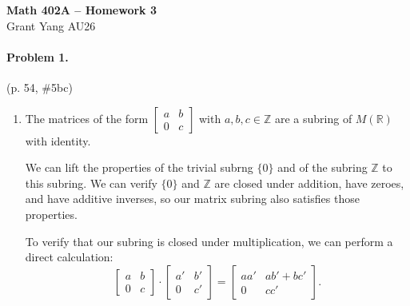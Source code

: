 \documentclass[12pt]{article}
\begin{document}
\begin{center} 
    {\large \textbf{Math 402A -- Homework 3}}
    \smallskip \\ 
    Grant Yang \hspace{1em} AU26
\end{center}

\paragraph{Problem 1.} (p. 54, \#5bc)
\begin{enumerate}
    \item[b.] { 
        The matrices of the form $\begin{bmatrix} a & b \\ 0 & c \end{bmatrix}$ with $a,b,c \in \mathbb Z$ are a subring of $M(\mathbb R)$ with identity.


        We can lift the properties of the trivial subrng $\{0\}$ and of the subring $\mathbb Z$ to this subring. We can verify $\{0\}$ and $\mathbb Z$ are closed under addition, have zeroes, and have additive inverses, so our matrix subring also satisfies those properties.

        To verify that our subring is closed under multiplication, we can perform a direct calculation:
        \[
        \begin{bmatrix} a & b \\ 0 & c \end{bmatrix} \cdot \begin{bmatrix}a' & b' \\ 0 & c'
        \end{bmatrix} = \begin{bmatrix}
            a a' & a b' + b c' \\
            0 & c c'
        \end{bmatrix}.
        \]

}
\end{enumerate}
\end{document}
